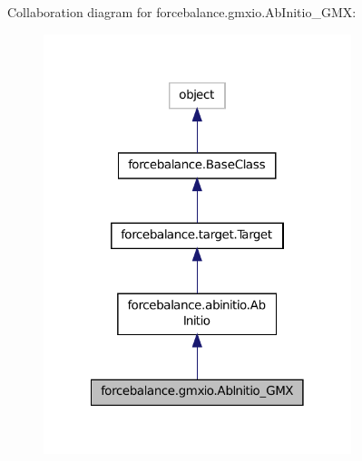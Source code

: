 Collaboration diagram for forcebalance.\-gmxio.\-Ab\-Initio\-\_\-\-G\-M\-X\-:
\nopagebreak
\begin{figure}[H]
\begin{center}
\leavevmode
\includegraphics[width=254pt]{classforcebalance_1_1gmxio_1_1AbInitio__GMX__coll__graph}
\end{center}
\end{figure}
